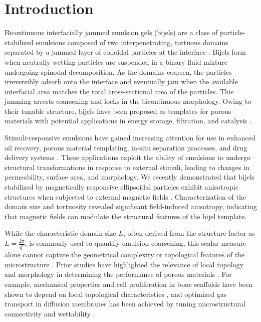 \section{Introduction}

Bicontinuous interfacially jammed emulsion gels (bijels) are a class of particle-stabilized emulsions composed of two interpenetrating, tortuous domains separated by a jammed layer of colloidal particles 
at the interface \cite{stratford_colloidal_2005, herzig_bicontinuous_2007, tavacoli_novel_2011}. Bijels form when neutrally wetting particles are suspended in a binary fluid mixture undergoing spinodal 
decomposition. As the domains coarsen, the particles irreversibly adsorb onto the interface and eventually jam when the available interfacial area matches the total cross-sectional area of the particles. 
This jamming arrests coarsening and locks in the bicontinuous morphology. Owing to their tunable structure, bijels have been proposed as templates for porous materials with potential applications in 
energy storage, filtration, and catalysis \cite{yabuno_preparation_2020, samdani_bicontinuous_2017, cha_bicontinuous_2019, garcia_scalable_2019, santiago_cordoba_aerobijels_2020}.

Stimuli-responsive emulsions have gained increasing attention for use in enhanced oil recovery, porous material templating, in-situ separation processes, and drug delivery systems 
\cite{tang_stimuli-responsive_2016, bago_rodriguez_capsules_2019, nakayama_stimuli-responsive_2018}. These applications exploit the ability of emulsions to undergo structural transformations in response 
to external stimuli, leading to changes in permeability, surface area, and morphology. We recently demonstrated that bijels stabilized by magnetically responsive ellipsoidal particles exhibit anisotropic 
structures when subjected to external magnetic fields \cite{karthikeyan_formation_2024}. Characterization of the domain size and tortuosity revealed significant field-induced anisotropy, indicating that 
magnetic fields can modulate the structural features of the bijel template.

While the characteristic domain size \(L\), often derived from the structure factor as \(L = \frac{2\pi}{q^*}\), is commonly used to quantify emulsion coarsening, this scalar measure alone cannot capture the 
geometrical complexity or topological features of the microstructure \cite{kendon_inertial_2001}. Prior studies have highlighted the relevance of local topology and morphology in determining the performance of 
porous materials \cite{liu_influence_2021, xiong_porosity_2024, shojaei_minimal_2022}. For example, mechanical properties and cell proliferation in bone scaffolds have been shown to depend on local topological 
characteristics \cite{xiong_porosity_2024}, and optimized gas transport in diffusion membranes has been achieved by tuning microstructural connectivity and wettability \cite{shojaei_minimal_2022}. 


